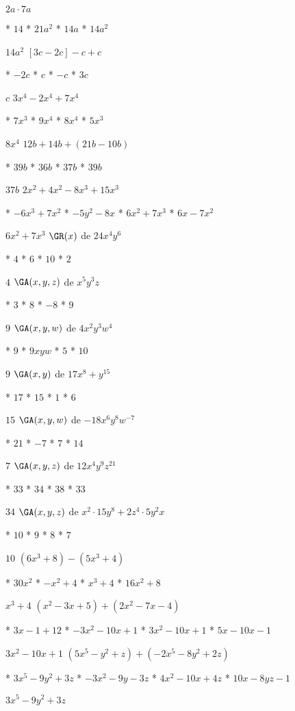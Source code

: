 $2a\cdot 7a$
\begin{enum}
  * $14$
  * $21a^2$
  * $14a$
  * $14a^2$
\end{enum}
$14a^2$
$[3c-2c]-c+c$
\begin{enum}
  * $-2c$
  * $c$
  * $-c$
  * $3c$
\end{enum}
$c$
$3x^4-2x^4+7x^4$
\begin{enum}
  * $7x^3$
  * $9x^4$
  * $8x^4$
  * $5x^3$
\end{enum}
$8x^4$
$12b+14b+(21b-10b)$
\begin{enum}
  * $39b$
  * $36b$
  * $37b$
  * $39b$
\end{enum}
$37b$
$2x^2+4x^2-8x^3+15x^3$
\begin{enum}
  * $-6x^3+7x^2$
  * $-5y^2-8x$
  * $6x^2+7x^3$
  * $6x-7x^2$
\end{enum}
$6x^2+7x^3$
$\GR(x)$ de $24x^4y^6$
\begin{enum}
  * $4$
  * $6$
  * $10$
  * $2$
\end{enum}
$4$
$\GA(x,y,z)$ de $x^5y^3z$
\begin{enum}
  * $3$
  * $8$
  * $-8$
  * $9$
\end{enum}
$9$
$\GA(x,y,w)$ de $4x^2y^3w^4$
\begin{enum}
  * $9$
  * $9xyw$
  * $5$
  * $10$
\end{enum}
$9$
$\GA(x,y)$ de $17x^8+y^{15}$
\begin{enum}
  * $17$
  * $15$
  * $1$
  * $6$
\end{enum}
$15$
$\GA(x,y,w)$ de $-18x^6y^8w^{-7}$
\begin{enum}
  * $21$
  * $-7$
  * $7$
  * $14$
\end{enum}
$7$
$\GA(x,y,z)$ de $12x^4y^9z^{21}$
\begin{enum}
  * $33$
  * $34$
  * $38$
  * $33$
\end{enum}
$34$
$\GA(x,y,z)$ de $x^2\cdot 15y^8+2z^4\cdot 5y^2x$
\begin{enum}
  * $10$
  * $9$
  * $8$
  * $7$
\end{enum}
$10$
$\left(6x^3+8\right)-\left(5x^3+4\right)$
\begin{enum}
  * $30x^2$
  * $-x^2+4$
  * $x^3+4$
  * $16x^2+8$
\end{enum}
$x^3+4$
$\left(x^2-3x+5\right)+\left(2x^2-7x-4\right)$
\begin{enum}
  * $3x-1+12$
  * $-3x^2-10x+1$
  * $3x^2-10x+1$
  * $5x-10x-1$
\end{enum}
$3x^2-10x+1$
$\left(5x^5-y^2+z\right)+\left(-2x^5-8y^2+2z\right)$
\begin{enum}
  * $3x^5-9y^2+3z$
  * $-3x^2-9y-3z$
  * $4x^2-10x+4z$
  * $10x-8yz-1$
\end{enum}
$3x^5-9y^2+3z$
